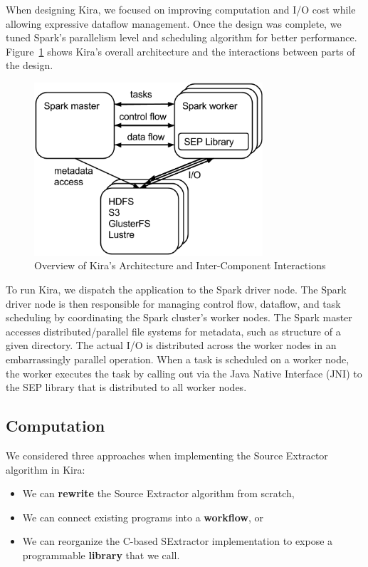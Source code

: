 \documentclass[10pt, conference, compsocconf]{IEEEtran}
\begin{document}
When designing Kira, we focused on improving computation and I/O cost while allowing expressive dataflow management.
Once the design was complete, we tuned Spark's parallelism level and scheduling algorithm for better performance.
Figure~\ref{fig:architecture} shows Kira's overall architecture and the interactions between parts of the design.

\begin{figure}[t]
	\begin{center}
		\includegraphics[width=85mm]{pictures/Kira-Architecture}
		\caption{Overview of Kira's Architecture and Inter-Component Interactions}
		\label{fig:architecture}
  	\end{center}
\end{figure}

To run Kira, we dispatch the application to the Spark driver node. The Spark driver node is then
responsible for managing control flow, dataflow, and task scheduling by coordinating the Spark
cluster's worker nodes. The Spark master accesses distributed/parallel file systems for metadata,
such as structure of a given directory. The actual I/O is distributed across the worker nodes in
an embarrassingly parallel operation. When a task is scheduled on a worker node, the worker executes
the task by calling out via the Java Native Interface (JNI) to the SEP library that is distributed to all worker nodes.

\subsection{Computation}

We considered three approaches when implementing the Source Extractor algorithm in Kira:

\begin{itemize}
\item We can \textbf{rewrite} the Source Extractor algorithm from scratch,
\item We can connect existing programs into a \textbf{workflow}, or
\item We can reorganize the C-based SExtractor implementation to expose a programmable
\textbf{library} that we call.
\end{itemize}
\end{document}
